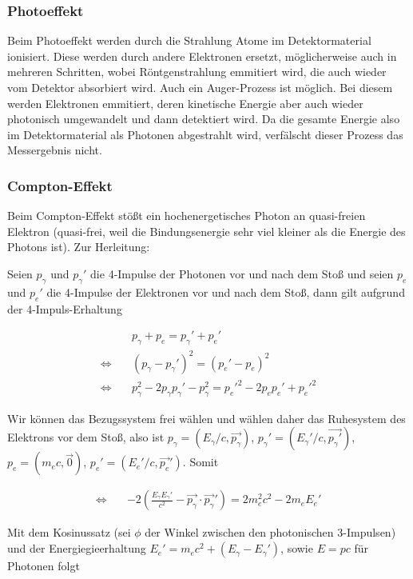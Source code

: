 \documentclass[a4paper,german,12pt,smallheadings]{scrartcl}
\begin{document}
\subsubsection{Photoeffekt}

Beim Photoeffekt werden durch die Strahlung Atome im Detektormaterial
ionisiert. Diese werden durch andere Elektronen ersetzt, möglicherweise auch in
mehreren Schritten, wobei Röntgenstrahlung emmitiert wird, die auch wieder vom
Detektor absorbiert wird. Auch ein Auger-Prozess ist möglich. Bei diesem werden
Elektronen emmitiert, deren kinetische Energie aber auch wieder photonisch
umgewandelt und dann detektiert wird. Da die gesamte Energie also im
Detektormaterial als Photonen abgestrahlt wird, verfälscht dieser Prozess das
Messergebnis nicht.

\subsubsection{Compton-Effekt}

Beim Compton-Effekt stößt ein hochenergetisches Photon an quasi-freien Elektron
(quasi-frei, weil die Bindungsenergie sehr viel kleiner als die Energie des
Photons ist). Zur Herleitung:

Seien $p_\gamma$ und $p_\gamma'$ die 4-Impulse der Photonen vor und nach dem
Stoß und seien $p_e$ und $p_e'$ die 4-Impulse der Elektronen vor und nach dem
Stoß, dann gilt aufgrund der 4-Impuls-Erhaltung

\begin{align}
  &p_\gamma + p_e = p_\gamma' + p_e' \\
  \Leftrightarrow\quad & (p_\gamma - p_\gamma')^2 = (p_e' - p_e)^2 \\
  \Leftrightarrow\quad & p_\gamma^2 - 2p_\gamma p_\gamma' - p_\gamma^2 = p_e'^2 - 2p_ep_e' + p_e'^2
\end{align}

Wir können das Bezugssystem frei wählen und wählen daher das Ruhesystem des
Elektrons vor dem Stoß, also ist $p_\gamma = (E_\gamma/c, \vec{p_\gamma})$,
$p_\gamma' = (E_\gamma'/c, \vec{p_\gamma'})$, $p_e = (m_e c, \vec{0})$, $p_e' =
(E_e'/c, \vec{p_e}')$. Somit

\begin{align}
  \Leftrightarrow\quad&-2\left(\frac{E_\gamma E_\gamma'}{c^2} - \vec{p_\gamma} \cdot \vec{p_\gamma}'\right) = 2m_e^2c^2 - 2 m_e E_e'
\end{align}

Mit dem Kosinussatz (sei $\phi$ der Winkel zwischen den photonischen
3-Impulsen) und der Energiegieerhaltung $E_e' = m_ec^2 + (E_\gamma -
E_\gamma')$, sowie $E = pc$ für Photonen folgt
\end{document}
